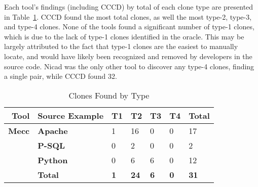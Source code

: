 \documentclass[smallextended]{svjour3}       %
\begin{document}
Each tool's findings (including CCCD) by total of each clone type are presented in Table~\ref{table:ClonesFoundByType}. CCCD found the most total clones, as well the most type-2, type-3, and type-4 clones. None of the tools found a significant number of type-1 clones, which is due to the lack of type-1 clones identified in the oracle. This may be largely attributed to the fact that type-1 clones are the easiest to manually locate, and would have likely been recognized and removed by developers in the source code. Nicad was the only other tool to discover any type-4 clones, finding a single pair, while CCCD found 32.

\begin{table}[thb!]

\begin{center}
\caption{Clones Found by Type}
\label{table:ClonesFoundByType}
\begin{tabular}{r||l|l|l|l|l|l}
\bfseries Tool & \bfseries Source Example & \bfseries T1 & \bfseries T2 & \bfseries T3 & \bfseries T4 & \bfseries Total \\ \hline\hline
\bfseries Mecc & \bfseries Apache & 1 & 16 & 0 & 0 & 17 \\ \cline{2-7}
& \bfseries P-SQL & 0 & 2 & 0 & 0 & 2 \\ \cline{2-7}
& \bfseries Python& 0 & 6 & 6 & 0 & 12 \\ \cline{2-7}
& \bfseries Total & \bfseries 1  & \bfseries 24   & \bfseries 6  & \bfseries 0  &  \bfseries 31 \\ \cline{2-7}



\end{tabular}
\end{center}
\end{table}
\end{document}
